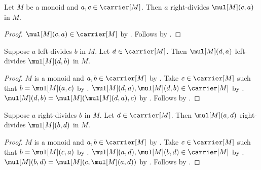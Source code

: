 \begin{proposition}\label{right_monoid_divides_product}
    Let $M$ be a monoid and $a,c\in\carrier[M]$.
    Then $a$ right-divides $\mul[M](c,a)$ in $M$.
\end{proposition}
\begin{proof}
    $\mul[M](c,a)\in\carrier[M]$ by
        .
    Follows by .
\end{proof}

\begin{theorem}\label{left_monoid_divisibility_mul_left}
    Suppose $a$ left-divides $b$ in $M$.
    Let $d\in\carrier[M]$.
    Then $\mul[M](d,a)$ left-divides $\mul[M](d,b)$ in $M$.
\end{theorem}
\begin{proof}
    $M$ is a monoid and $a,b\in\carrier[M]$ by
        .
    Take $c\in\carrier[M]$ such that $b=\mul[M](a,c)$ by
        .
    $\mul[M](d,a),\mul[M](d,b)\in\carrier[M]$ by
        .
    $\mul[M](d,b)=\mul[M](\mul[M](d,a),c)$ by
        .
    Follows by .
\end{proof}

\begin{theorem}\label{right_monoid_divisibility_mul_right}
    Suppose $a$ right-divides $b$ in $M$.
    Let $d\in\carrier[M]$.
    Then $\mul[M](a,d)$ right-divides $\mul[M](b,d)$ in $M$.
\end{theorem}
\begin{proof}
    $M$ is a monoid and $a,b\in\carrier[M]$ by
        .
    Take $c\in\carrier[M]$ such that $b=\mul[M](c,a)$ by
        .
    $\mul[M](a,d),\mul[M](b,d)\in\carrier[M]$ by
        .
    $\mul[M](b,d)=\mul[M](c,\mul[M](a,d))$ by
        .
    Follows by .
\end{proof}

